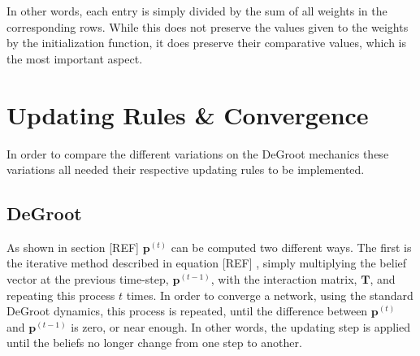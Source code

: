 \documentclass{article}
\newcommand{\T}{\textbf{T}}
\begin{document}
In other words, each entry is simply divided by the sum of all weights in the corresponding rows. While this does not preserve the values given to the weights by the initialization function, it does preserve their comparative values, which is the most important aspect.

\newpage

\section{Updating Rules \& Convergence}

In order to compare the different variations on the DeGroot mechanics these variations all needed their respective updating rules to be implemented.

\subsection{DeGroot}

As shown in section [REF] $\textbf{p}^{(t)}$ can be computed two different ways. The first is the iterative method described in equation [REF] , simply multiplying the belief vector at the previous time-step, $\textbf{p}^{(t-1)}$, with the interaction matrix, $\T$, and repeating this process $t$ times. In order to converge a network, using the standard DeGroot dynamics, this process is repeated, until the difference between $\textbf{p}^{(t)}$ and $\textbf{p}^{(t-1)}$ is zero, or near enough. In other words, the updating step is applied until the beliefs no longer change from one step to another.
\end{document}

